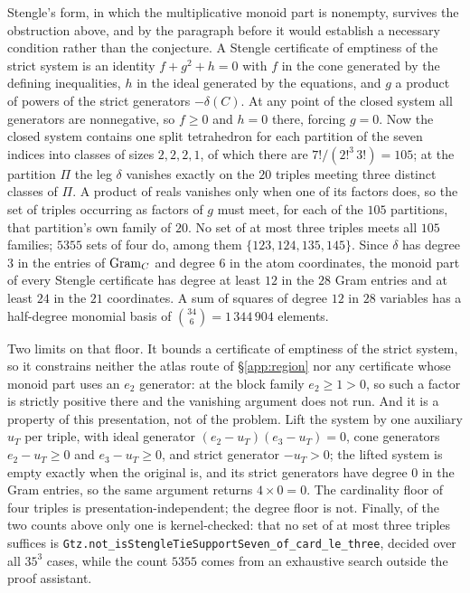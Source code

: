 \begin{remark}\label{rem:stengle}
Stengle's form, in which the multiplicative monoid part is nonempty,
survives the obstruction above, and by the paragraph before it would
establish a necessary condition rather than the conjecture.  A Stengle
certificate of emptiness of the strict system is an
identity $f+g^2+h=0$ with $f$ in the cone generated by the defining
inequalities, $h$ in the ideal generated by the equations, and $g$ a product
of powers of the strict generators $-\delta(C)$.  At any point of
the closed system all generators are nonnegative, so $f\ge0$ and $h=0$ there,
forcing $g=0$.  Now the closed system contains one split tetrahedron for each
partition of the seven indices into classes of sizes $2,2,2,1$, of which there
are $7!/(2!^3\,3!)=105$; at the partition $\Pi$ the leg $\delta$ vanishes
exactly on the $20$ triples meeting three distinct classes of $\Pi$.  A
product of reals vanishes only when one of its factors does, so the set of
triples occurring as factors of $g$ must meet, for each of the $105$
partitions, that partition's own family of $20$.  No set of at most three
triples meets all $105$ families; $5355$ sets of four do, among them
$\{123,124,135,145\}$.  Since $\delta$ has degree $3$ in the entries of
$\operatorname{Gram}_C$ and degree $6$ in the atom coordinates, the monoid part of every
Stengle certificate has degree at least $12$ in the $28$ Gram entries and at
least $24$ in the $21$ coordinates.  A sum of squares of degree $12$ in $28$
variables has a half-degree monomial basis of $\binom{34}{6}=1\,344\,904$
elements.

Two limits on that floor.  It bounds a certificate of emptiness of the
strict system, so it constrains neither the atlas route of
\S\ref{app:region} nor any certificate whose monoid part uses an $e_2$
generator: at the block family $e_2\ge1>0$, so such a factor is strictly
positive there and the vanishing argument does not run.  And it is a
property of this presentation, not of the problem.  Lift the system by one
auxiliary $u_T$ per triple, with ideal generator
$(e_2-u_T)(e_3-u_T)=0$, cone generators $e_2-u_T\ge0$ and $e_3-u_T\ge0$,
and strict generator $-u_T>0$; the lifted system is empty exactly when the
original is, and its strict generators have degree $0$ in the Gram entries,
so the same argument returns $4\times0=0$.  The cardinality floor of four
triples is presentation-independent; the degree floor is not.  Finally, of
the two counts above only one is kernel-checked: that no set of at most
three triples suffices is
\texttt{Gtz.not\_is\allowbreak Stengle\allowbreak Tie\allowbreak Support\allowbreak Seven\_of\_card\_le\_three}, decided over
all $35^3$ cases, while the count $5355$ comes from an exhaustive search
outside the proof assistant.
\end{remark}

